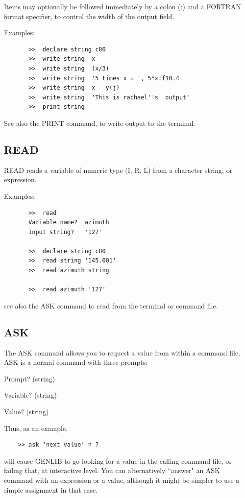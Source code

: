 \documentclass[11pt,twoside]{report}
\begin{document}
Items may optionally be followed immediately by a colon (:\index{:}) and a
FORTRAN format specifier, to control the width of the
output field.

Examples:
\begin{verbatim}
       >>  declare string c80
       >>  write string  x
       >>  write string  (x/3)
       >>  write string  '5 times x = ', 5*x:f10.4
       >>  write string  x   y(j)
       >>  write string  'This is rachael''s  output'
       >>  print string
\end{verbatim}

See also the PRINT command, to write output to the terminal.

\subsection{READ}

READ reads a variable of numeric type (I, R, L) from a character string,
or expression.

Examples:
\begin{verbatim}
       >>  read
       Variable name?  azimuth
       Input string?   '127'

       >>  declare string c80
       >>  read string '145.001'
       >>  read azimuth string

       >>  read azimuth '127'
\end{verbatim}

see also the ASK command to read from the terminal or command file.

\subsection{ASK}

The ASK command allows you to request a value from within a command file.
ASK is a normal command with three prompts:
\begin{description}
\item {Prompt?}         (string)
\item {Variable?}       (string)
\item {Value?}          (string)
\end{description}

Thus, as an example,
\begin{verbatim}
    >> ask 'next value' n ?
\end{verbatim}
will cause GENLIB to go looking for a value in the calling command file, or
failing that, at interactive level. You can alternatively ``answer" an ASK
command with an expression or a value, although it might be simpler to use a
simple assignment in that case.
\end{document}
